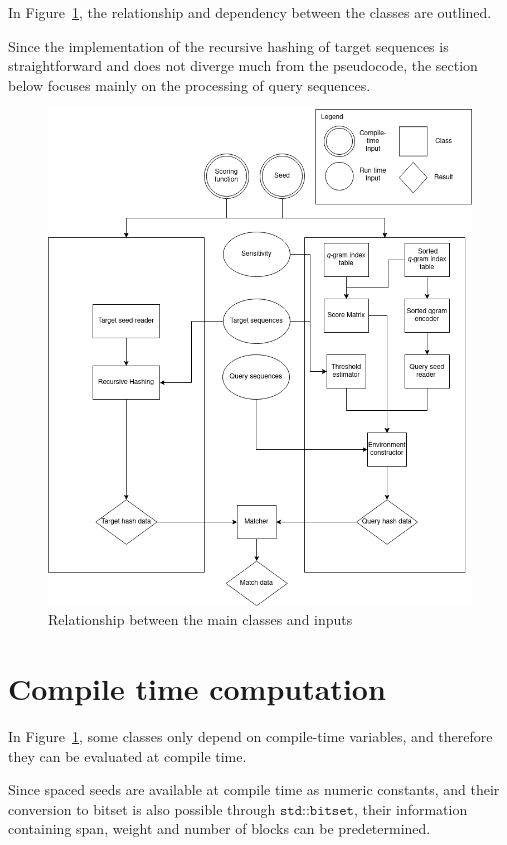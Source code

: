 \documentclass[twoside,a4paper,bsc]{master}
\begin{document}
In Figure~\ref{fig:classes}, the relationship and dependency between the
classes are outlined.

Since the implementation of the recursive hashing of
target sequences is straightforward and does not diverge much from the
pseudocode, the section below focuses mainly on the processing of query
sequences.

\begin{figure}[t]
\begin{center}
\includegraphics[scale=0.5]{graphics/ClassDiagram.png}
\end{center}
\caption{Relationship between the main classes and inputs}
\label{fig:classes}
\end{figure}

\section{Compile time computation}
In Figure~\ref{fig:classes}, some classes only depend on compile-time variables,
and therefore they can be evaluated at compile time.

Since spaced seeds are available at compile time as numeric constants, and their
conversion to bitset is also possible through \(\texttt{std::bitset}\), their
information containing span, weight and number of blocks can be predetermined.
\end{document}
